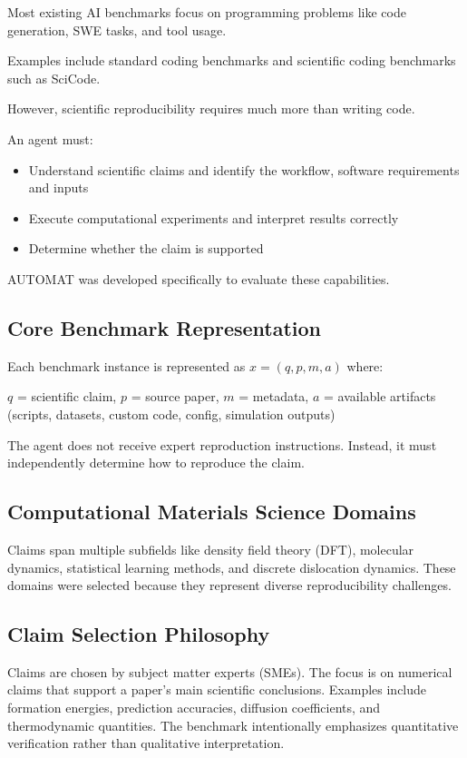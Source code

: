 \documentclass[11pt]{article}
\begin{document}
Most existing AI benchmarks focus on programming problems like code generation, SWE tasks, and tool usage. 

Examples include standard coding benchmarks and scientific coding benchmarks such as SciCode.

However, scientific reproducibility requires much more than writing code.

An agent must:

\begin{itemize}
    \item Understand scientific claims and identify the workflow, software requirements and inputs
    \item Execute computational experiments and interpret results correctly
    \item Determine whether the claim is supported
\end{itemize}

AUTOMAT was developed specifically to evaluate these capabilities.

\subsection*{Core Benchmark Representation}

Each benchmark instance is represented as $x=(q,p,m,a)$ where:

$q$ = scientific claim, $p$ = source paper, $m$ = metadata, $a$ = available artifacts (scripts, datasets, custom code, config, simulation outputs)


The agent does not receive expert reproduction instructions. Instead, it must independently determine how to reproduce the claim.

\subsection*{Computational Materials Science Domains}

Claims span multiple subfields like density field theory (DFT), molecular dynamics, statistical learning methods, and discrete dislocation dynamics. These domains were selected because they represent diverse reproducibility challenges.

\subsection*{Claim Selection Philosophy}

Claims are chosen by subject matter experts (SMEs). The focus is on numerical claims that support a paper's main scientific conclusions.
Examples include formation energies, prediction accuracies, diffusion coefficients, and thermodynamic quantities. The benchmark intentionally emphasizes quantitative verification rather than qualitative interpretation.
\end{document}
